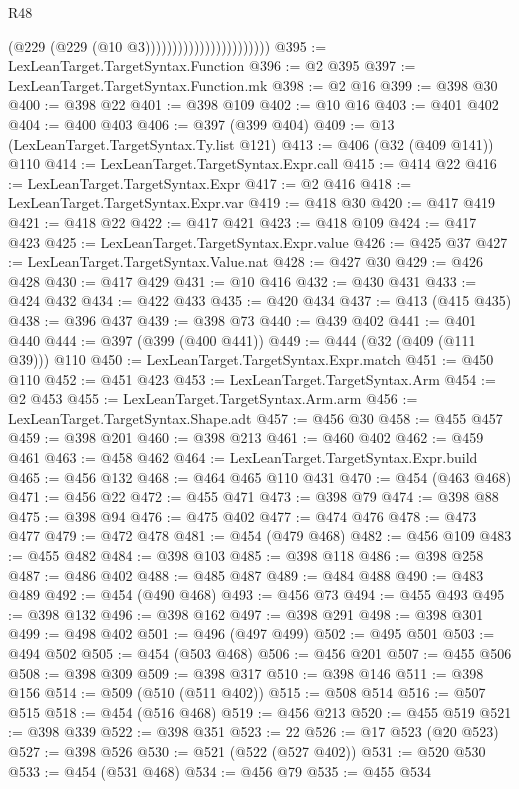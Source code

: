 \begin{lexlean}{R48}
\begin{coremodule}
                                            (@229 (@229 (@10 @3)))))))))))))))))))))))
@395 := LexLeanTarget.TargetSyntax.Function
@396 := @2 @395
@397 := LexLeanTarget.TargetSyntax.Function.mk
@398 := @2 @16
@399 := @398 @30
@400 := @398 @22
@401 := @398 @109
@402 := @10 @16
@403 := @401 @402
@404 := @400 @403
@406 := @397 (@399 @404)
@409 := @13 (LexLeanTarget.TargetSyntax.Ty.list @121)
@413 := @406 (@32 (@409 @141)) @110
@414 := LexLeanTarget.TargetSyntax.Expr.call
@415 := @414 @22
@416 := LexLeanTarget.TargetSyntax.Expr
@417 := @2 @416
@418 := LexLeanTarget.TargetSyntax.Expr.var
@419 := @418 @30
@420 := @417 @419
@421 := @418 @22
@422 := @417 @421
@423 := @418 @109
@424 := @417 @423
@425 := LexLeanTarget.TargetSyntax.Expr.value
@426 := @425 @37
@427 := LexLeanTarget.TargetSyntax.Value.nat
@428 := @427 @30
@429 := @426 @428
@430 := @417 @429
@431 := @10 @416
@432 := @430 @431
@433 := @424 @432
@434 := @422 @433
@435 := @420 @434
@437 := @413 (@415 @435)
@438 := @396 @437
@439 := @398 @73
@440 := @439 @402
@441 := @401 @440
@444 := @397 (@399 (@400 @441))
@449 := @444 (@32 (@409 (@111 @39))) @110
@450 := LexLeanTarget.TargetSyntax.Expr.match
@451 := @450 @110
@452 := @451 @423
@453 := LexLeanTarget.TargetSyntax.Arm
@454 := @2 @453
@455 := LexLeanTarget.TargetSyntax.Arm.arm
@456 := LexLeanTarget.TargetSyntax.Shape.adt
@457 := @456 @30
@458 := @455 @457
@459 := @398 @201
@460 := @398 @213
@461 := @460 @402
@462 := @459 @461
@463 := @458 @462
@464 := LexLeanTarget.TargetSyntax.Expr.build
@465 := @456 @132
@468 := @464 @465 @110 @431
@470 := @454 (@463 @468)
@471 := @456 @22
@472 := @455 @471
@473 := @398 @79
@474 := @398 @88
@475 := @398 @94
@476 := @475 @402
@477 := @474 @476
@478 := @473 @477
@479 := @472 @478
@481 := @454 (@479 @468)
@482 := @456 @109
@483 := @455 @482
@484 := @398 @103
@485 := @398 @118
@486 := @398 @258
@487 := @486 @402
@488 := @485 @487
@489 := @484 @488
@490 := @483 @489
@492 := @454 (@490 @468)
@493 := @456 @73
@494 := @455 @493
@495 := @398 @132
@496 := @398 @162
@497 := @398 @291
@498 := @398 @301
@499 := @498 @402
@501 := @496 (@497 @499)
@502 := @495 @501
@503 := @494 @502
@505 := @454 (@503 @468)
@506 := @456 @201
@507 := @455 @506
@508 := @398 @309
@509 := @398 @317
@510 := @398 @146
@511 := @398 @156
@514 := @509 (@510 (@511 @402))
@515 := @508 @514
@516 := @507 @515
@518 := @454 (@516 @468)
@519 := @456 @213
@520 := @455 @519
@521 := @398 @339
@522 := @398 @351
@523 := 22
@526 := @17 @523 (@20 @523)
@527 := @398 @526
@530 := @521 (@522 (@527 @402))
@531 := @520 @530
@533 := @454 (@531 @468)
@534 := @456 @79
@535 := @455 @534

\end{coremodule}
\end{lexlean}
